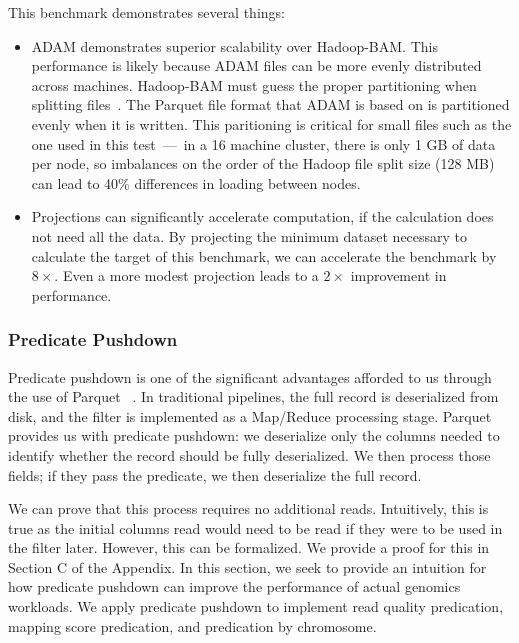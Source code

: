 \documentclass{acm_proc_article-sp}
\begin{document}
This benchmark demonstrates several things:

\begin{itemize}
\item ADAM demonstrates superior scalability over Hadoop-BAM. This performance is likely because ADAM files can be more evenly distributed across machines.
Hadoop-BAM must guess the proper partitioning when splitting files~\cite{niemenmaa12}. The Parquet file format that ADAM is based on is partitioned
evenly when it is written\cite{parquet}. This paritioning is critical for small files such as the one used in this test~---~in a 16 machine cluster, there is only 1 GB of
data per node, so imbalances on the order of the Hadoop file split size (128 MB) can lead to 40\% differences in loading between nodes.
\item Projections can significantly accelerate computation, if the calculation does not need all the data. By projecting the minimum dataset necessary
to calculate the target of this benchmark, we can accelerate the benchmark by $8\times$. Even a more modest projection leads to a $2\times$
improvement in performance.
\end{itemize}

\subsubsection{Predicate Pushdown}
\label{sec:predicate-pushdown}

Predicate pushdown is one of the significant advantages afforded to us through the use of Parquet	~\cite{parquet}. In traditional
pipelines, the full record is deserialized from disk, and the filter is implemented as a Map/Reduce processing stage. Parquet provides
us with predicate pushdown: we deserialize only the columns needed to identify whether the record should be fully deserialized. We
then process those fields; if they pass the predicate, we then deserialize the full record.

We can prove that this process requires no additional reads. Intuitively, this is true as the initial columns read would need to be read
if they were to be used in the filter later. However, this can be formalized. We provide a proof for this in Section C of the Appendix.
In this section, we seek to provide an intuition for how predicate pushdown can improve the performance of actual genomics workloads.
We apply predicate pushdown to implement read quality predication, mapping score predication, and predication by chromosome. 
\end{document}
